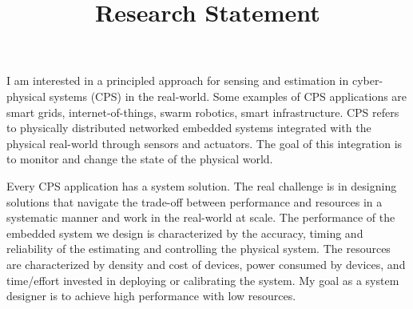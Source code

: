 \documentclass[10pt]{article}
\date{}
\begin{document}

\setlength{\droptitle}{-5em}

\title{{\Large  Research Statement}}
\maketitle

\vspace{-4em}



I am interested in a principled approach for sensing and estimation in cyber-physical systems (CPS) in the real-world. Some examples of CPS applications are smart grids, internet-of-things, swarm robotics, smart infrastructure.
CPS refers to physically distributed networked embedded systems integrated with the physical real-world through sensors and actuators. The goal of this integration is to monitor and change the state of the physical world. 

Every CPS application has a system solution. The real challenge is in designing solutions that navigate the trade-off between performance and resources in a systematic manner and work in the real-world at scale. %
The performance of the embedded system we design is characterized by the accuracy, timing and reliability of the estimating and controlling the physical system. The resources are characterized by density and cost of devices, power consumed by devices, and time/effort invested in deploying or calibrating the system. My goal as a system designer is to achieve high performance with low resources. %
\end{document}
